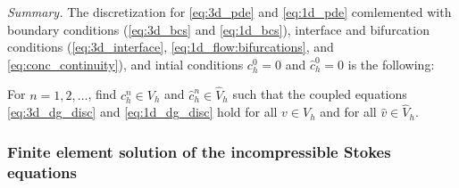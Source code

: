  \textit{Summary.} The discretization for \eqref{eq:3d_pde} and \eqref{eq:1d_pde} comlemented with boundary conditions (\eqref{eq:3d_bcs} and \eqref{eq:1d_bcs}), interface and bifurcation  conditions (\eqref{eq:3d_interface}, \eqref{eq:1d_flow:bifurcations}, and \eqref{eq:conc_continuity}), and intial conditions $c_h^0 =0 $ and $\hat c_h^0 = 0 $ is the following: 

 For $n = 1,2, \ldots $, find  $c_h^n \in V_h$ and $\hat c^n_h \in \hat V_h$ such that the coupled equations \eqref{eq:3d_dg_disc} and \eqref{eq:1d_dg_disc} hold for all $v \in V_h$ and for all $\hat v \in \hat V_h$. 
\subsubsection{Finite element solution of the incompressible Stokes equations}

